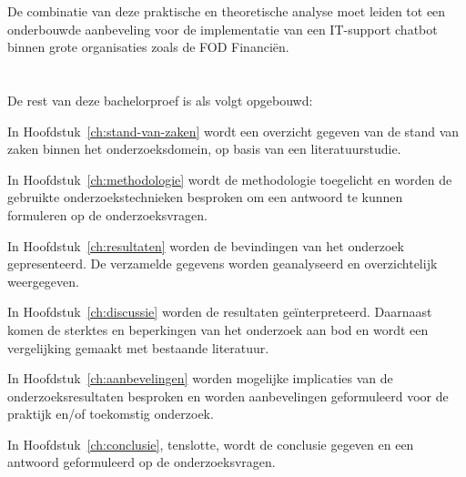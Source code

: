 De combinatie van deze praktische en theoretische analyse moet leiden tot een onderbouwde aanbeveling voor de implementatie van een IT-support chatbot binnen grote organisaties zoals de FOD Financiën.

\section{}%
\label{sec:opzet-bachelorproef}

De rest van deze bachelorproef is als volgt opgebouwd:

In Hoofdstuk~\ref{ch:stand-van-zaken} wordt een overzicht gegeven van de stand van zaken binnen het onderzoeksdomein, op basis van een literatuurstudie.

In Hoofdstuk~\ref{ch:methodologie} wordt de methodologie toegelicht en worden de gebruikte onderzoekstechnieken besproken om een antwoord te kunnen formuleren op de onderzoeksvragen.

In Hoofdstuk~\ref{ch:resultaten} worden de bevindingen van het onderzoek gepresenteerd. De verzamelde gegevens worden geanalyseerd en overzichtelijk weergegeven.

In Hoofdstuk~\ref{ch:discussie} worden de resultaten geïnterpreteerd. Daarnaast komen de sterktes en beperkingen van het onderzoek aan bod en wordt een vergelijking gemaakt met bestaande literatuur.

In Hoofdstuk~\ref{ch:aanbevelingen} worden mogelijke implicaties van de onderzoeksresultaten besproken en worden aanbevelingen geformuleerd voor de praktijk en/of toekomstig onderzoek.

In Hoofdstuk~\ref{ch:conclusie}, tenslotte, wordt de conclusie gegeven en een antwoord geformuleerd op de onderzoeksvragen.